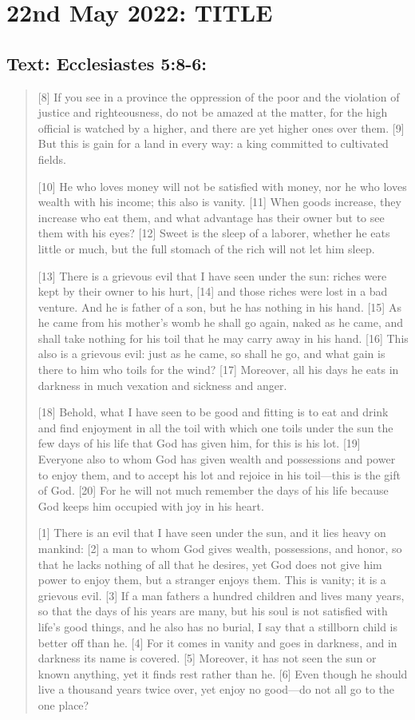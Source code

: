 \section{22nd May 2022: TITLE}
\subsection*{Text: Ecclesiastes 5:8-6:}
  \begin{quote}
    [8] If you see in a province the oppression of the poor and the violation
    of justice and righteousness, do not be amazed at the matter, for the
    high official is watched by a higher, and there are yet higher ones over
    them.  [9] But this is gain for a land in every way: a king committed to
    cultivated fields.

    [10] He who loves money will not be satisfied with money, nor he who
    loves wealth with his income; this also is vanity.  [11] When goods
    increase, they increase who eat them, and what advantage has their owner
    but to see them with his eyes?  [12] Sweet is the sleep of a laborer,
    whether he eats little or much, but the full stomach of the rich will not
    let him sleep.

    [13] There is a grievous evil that I have seen under the sun: riches were
    kept by their owner to his hurt, [14] and those riches were lost in a bad
    venture.  And he is father of a son, but he has nothing in his hand.
    [15] As he came from his mother’s womb he shall go again, naked as he
    came, and shall take nothing for his toil that he may carry away in his
    hand.  [16] This also is a grievous evil: just as he came, so shall he
    go, and what gain is there to him who toils for the wind?  [17] Moreover,
    all his days he eats in darkness in much vexation and sickness and anger.

    [18] Behold, what I have seen to be good and fitting is to eat and drink
    and find enjoyment in all the toil with which one toils under the sun the
    few days of his life that God has given him, for this is his lot.  [19]
    Everyone also to whom God has given wealth and possessions and power to
    enjoy them, and to accept his lot and rejoice in his toil—this is the
    gift of God.  [20] For he will not much remember the days of his life
    because God keeps him occupied with joy in his heart.

    [1] There is an evil that I have seen under the sun, and it lies heavy on
    mankind: [2] a man to whom God gives wealth, possessions, and honor, so
    that he lacks nothing of all that he desires, yet God does not give him
    power to enjoy them, but a stranger enjoys them.  This is vanity; it is a
    grievous evil.  [3] If a man fathers a hundred children and lives many
    years, so that the days of his years are many, but his soul is not
    satisfied with life’s good things, and he also has no burial, I say that
    a stillborn child is better off than he.  [4] For it comes in vanity and
    goes in darkness, and in darkness its name is covered.  [5] Moreover, it
    has not seen the sun or known anything, yet it finds rest rather than he.
    [6] Even though he should live a thousand years twice over, yet enjoy no
    good—do not all go to the one place?


\end{quote}
